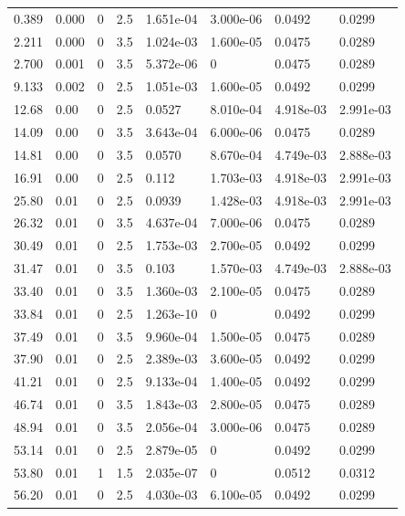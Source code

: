 \documentclass[preview]{standalone}
\begin{document}
{{\begin{tabular}{L{1.2cm}C{1.2cm} C{0.3cm}C{0.5cm} C{1.4cm}C{1.4cm} C{1.4cm}C{1.4cm}}
  0.389  &  0.000  & 0     & 2.5 &  1.651e-04  & 3.000e-06  & 0.0492 &  0.0299   \\ 
  2.211  &  0.000  & 0     & 3.5 &  1.024e-03  & 1.600e-05  & 0.0475 &  0.0289   \\ 
  2.700  &  0.001  & 0     & 3.5 &  5.372e-06  & 0  & 0.0475 &  0.0289   \\ 
  9.133  &  0.002  & 0     & 2.5 &  1.051e-03  & 1.600e-05  & 0.0492 &  0.0299   \\ 
  12.68  &  0.00  & 0     & 2.5 &  0.0527  & 8.010e-04  & 4.918e-03 &  2.991e-03   \\ 
  14.09  &  0.00  & 0     & 3.5 &  3.643e-04  & 6.000e-06  & 0.0475 &  0.0289   \\ 
  14.81  &  0.00  & 0     & 3.5 &  0.0570  & 8.670e-04  & 4.749e-03 &  2.888e-03   \\ 
  16.91  &  0.00  & 0     & 2.5 &  0.112  & 1.703e-03  & 4.918e-03 &  2.991e-03   \\ 
  25.80  &  0.01  & 0     & 2.5 &  0.0939  & 1.428e-03  & 4.918e-03 &  2.991e-03   \\ 
  26.32  &  0.01  & 0     & 3.5 &  4.637e-04  & 7.000e-06  & 0.0475 &  0.0289   \\ 
  30.49  &  0.01  & 0     & 2.5 &  1.753e-03  & 2.700e-05  & 0.0492 &  0.0299   \\ 
  31.47  &  0.01  & 0     & 3.5 &  0.103  & 1.570e-03  & 4.749e-03 &  2.888e-03   \\ 
  33.40  &  0.01  & 0     & 3.5 &  1.360e-03  & 2.100e-05  & 0.0475 &  0.0289   \\ 
  33.84  &  0.01  & 0     & 2.5 &  1.263e-10  & 0  & 0.0492 &  0.0299   \\ 
  37.49  &  0.01  & 0     & 3.5 &  9.960e-04  & 1.500e-05  & 0.0475 &  0.0289   \\ 
  37.90  &  0.01  & 0     & 2.5 &  2.389e-03  & 3.600e-05  & 0.0492 &  0.0299   \\ 
  41.21  &  0.01  & 0     & 2.5 &  9.133e-04  & 1.400e-05  & 0.0492 &  0.0299   \\ 
  46.74  &  0.01  & 0     & 3.5 &  1.843e-03  & 2.800e-05  & 0.0475 &  0.0289   \\ 
  48.94  &  0.01  & 0     & 3.5 &  2.056e-04  & 3.000e-06  & 0.0475 &  0.0289   \\ 
  53.14  &  0.01  & 0     & 2.5 &  2.879e-05  & 0  & 0.0492 &  0.0299   \\ 
  53.80  &  0.01  & 1     & 1.5 &  2.035e-07  & 0  & 0.0512 &  0.0312   \\ 
  56.20  &  0.01  & 0     & 2.5 &  4.030e-03  & 6.100e-05  & 0.0492 &  0.0299   \\ 

\end{tabular}}}
\end{document}
